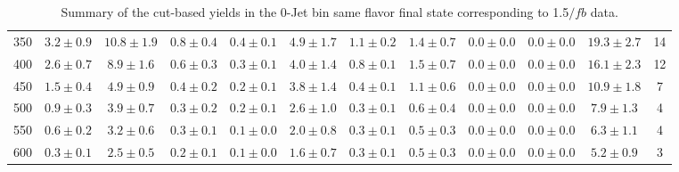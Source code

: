 \begin{table}
{\begin{center}
\begin{tabular}{l c c c c c c c c c c c }
350 & $3.2\pm0.9$ & $10.8\pm1.9$ & $0.8\pm0.4$ & $0.4\pm0.1$ & $4.9\pm1.7$ & $1.1\pm0.2$ & $1.4\pm0.7$ & $0.0\pm0.0$ & $0.0\pm0.0$ & $19.3\pm2.7$ & 14 \\
400 & $2.6\pm0.7$ & $8.9\pm1.6$ & $0.6\pm0.3$ & $0.3\pm0.1$ & $4.0\pm1.4$ & $0.8\pm0.1$ & $1.5\pm0.7$ & $0.0\pm0.0$ & $0.0\pm0.0$ & $16.1\pm2.3$ & 12 \\
450 & $1.5\pm0.4$ & $4.9\pm0.9$ & $0.4\pm0.2$ & $0.2\pm0.1$ & $3.8\pm1.4$ & $0.4\pm0.1$ & $1.1\pm0.6$ & $0.0\pm0.0$ & $0.0\pm0.0$ & $10.9\pm1.8$ & 7 \\
500 & $0.9\pm0.3$ & $3.9\pm0.7$ & $0.3\pm0.2$ & $0.2\pm0.1$ & $2.6\pm1.0$ & $0.3\pm0.1$ & $0.6\pm0.4$ & $0.0\pm0.0$ & $0.0\pm0.0$ & $7.9\pm1.3$ & 4 \\
550 & $0.6\pm0.2$ & $3.2\pm0.6$ & $0.3\pm0.1$ & $0.1\pm0.0$ & $2.0\pm0.8$ & $0.3\pm0.1$ & $0.5\pm0.3$ & $0.0\pm0.0$ & $0.0\pm0.0$ & $6.3\pm1.1$ & 4 \\
600 & $0.3\pm0.1$ & $2.5\pm0.5$ & $0.2\pm0.1$ & $0.1\pm0.0$ & $1.6\pm0.7$ & $0.3\pm0.1$ & $0.5\pm0.3$ & $0.0\pm0.0$ & $0.0\pm0.0$ & $5.2\pm0.9$ & 3 \\
\hline
\end{tabular}
\end{center}
}
\caption{Summary of the cut-based yields in the 0-Jet bin same flavor final state corresponding to 1.5$/fb$ data.}
\end{table}
